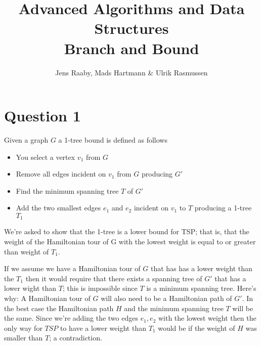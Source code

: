 \documentclass[a4paper, 10pt, oneside, article]{memoir}
\title{Advanced Algorithms and Data Structures\\ Branch and Bound}
\author{Jens Raaby, Mads Hartmann \& Ulrik Rasmussen}
\begin{document}
\maketitle

\section*{Question 1}


Given a graph $G$ a 1-tree bound is defined as follows 

\begin{itemize}
  \item You select a vertex $v_1$ from $G$
  \item Remove all edges incident on $v_1$ from $G$ producing $G'$
  \item Find the minimum spanning tree $T$ of $G'$
  \item Add the two smallest edges $e_1$ and $e_2$ incident on $v_1$ to $T$ producing a 1-tree $T_1$
\end{itemize}

We're asked to show that the 1-tree is a lower bound for TSP; that is,
that the weight of the Hamiltonian tour of G with the lowest weight
is equal to or greater than weight  of $T_1$.

If we assume we have a Hamiltonian tour of $G$ that has has a lower
weight than the $T_1$ then it would require that there exists a
spanning tree of $G'$ that  has a lower wight than $T$; this is
impossible since $T$ is a minimum spanning tree. Here's why: A Hamiltonian
tour of $G$ will also need to be a Hamiltonian path of $G'$. In the best case 
the Hamiltonian path $H$ and the minimum spanning tree $T$ will be the same. Since we're
adding the two edges $e_1, e_2$ with the lowest weight then the only way for
$TSP$ to have a lower weight than $T_1$ would be if the weight of $H$ was smaller 
than $T$; a contradiction.







\end{document}
